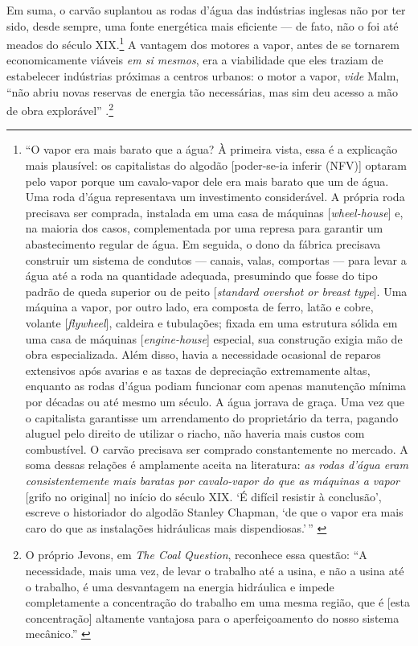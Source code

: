 Em suma, o carvão suplantou as rodas d'água das indústrias inglesas não por ter sido, desde sempre, uma fonte energética mais eficiente --- de fato, não o foi até meados do século XIX.\footnote{``O vapor era mais barato que a água? À primeira vista, essa é a explicação mais plausível: os capitalistas do algodão {[}poder-se-ia inferir (NFV){]} optaram pelo vapor porque um cavalo-vapor dele era mais barato que um de água. Uma roda d'água representava um investimento considerável. A própria roda precisava ser comprada, instalada em uma casa de máquinas {[}\emph{wheel-house}{]} e, na maioria dos casos, complementada por uma represa para garantir um abastecimento regular de água. Em seguida, o dono da fábrica precisava construir um sistema de condutos --- canais, valas, comportas --- para levar a água até a roda na quantidade adequada, presumindo que fosse do tipo padrão de queda superior ou de peito {[}\emph{standard overshot or breast type}{]}. Uma máquina a vapor, por outro lado, era composta de ferro, latão e cobre, volante {[}\emph{flywheel}{]}, caldeira e tubulações; fixada em uma estrutura sólida em uma casa de máquinas {[}\emph{engine-house}{]} especial, sua construção exigia mão de obra especializada. Além disso, havia a necessidade ocasional de reparos extensivos após avarias e as taxas de depreciação extremamente altas, enquanto as rodas d'água podiam funcionar com apenas manutenção mínima por décadas ou até mesmo um século. A água jorrava de graça. Uma vez que o capitalista garantisse um arrendamento do proprietário da terra, pagando aluguel pelo direito de utilizar o riacho, não haveria mais custos com combustível. O carvão precisava ser comprado constantemente no mercado. A soma dessas relações é amplamente aceita na literatura: \emph{as rodas d'água eram consistentemente mais baratas por cavalo-vapor do que as máquinas a vapor} {[}grifo no original{]} no início do século XIX. `É difícil resistir à conclusão', escreve o historiador do algodão Stanley Chapman, `de que o vapor era mais caro do que as instalações hidráulicas mais dispendiosas.'\,'' \parencite[p. 29-30]{Malm2013}} A vantagem dos motores a vapor, antes de se tornarem economicamente viáveis \textit{em si mesmos}, era a viabilidade que eles traziam de estabelecer indústrias próximas a centros urbanos: o motor a vapor, \textit{vide} Malm, ``não abriu novas reservas de energia tão necessárias, mas sim deu acesso a mão de obra explorável'' \parencite[p. 33]{Malm2013}.\footnote{O próprio Jevons, em \emph{The Coal Question}, reconhece essa questão: ``A necessidade, mais uma vez, de levar o trabalho até a usina, e não a usina até o trabalho, é uma desvantagem na energia hidráulica e impede completamente a concentração do trabalho em uma mesma região, que é {[}esta concentração{]} altamente vantajosa para o aperfeiçoamento do nosso sistema mecânico.'' \parencite[p. 89]{Jevons1866}}

